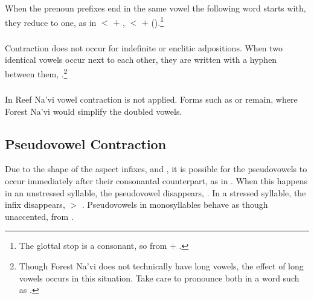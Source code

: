 \subsubsection{} When the prenoun prefixes end in the same vowel the
following word starts with, they reduce to one, as in  $<$
 $+$ ,  $<$  $+$ 
().\footnote{The glottal stop is a
consonant, so  from  $+$ .}
\label{l-and-s:phonotactics:precontract}

\subsubsection{} Contraction does not occur for indefinite  or
enclitic adpositions.  When two identical vowels occur next to each
other, they are written with a hyphen between them, 
  .\footnote{Though Forest
Na'vi does not technically have long vowels, the effect of long vowels
occurs in this situation.  Take care to pronounce both  in a word
such as .}

\subsubsection{} In Reef Na'vi vowel contraction is not applied.
Forms such as  or  remain, where Forest Na'vi
would simplify the doubled vowels.
\label{rn:no-contract}

\subsection{Pseudovowel Contraction} Due to the shape of the aspect
infixes,  and , it is possible for the
pseudovowels to occur immediately after their consonantal counterpart,
as in .  When this happens in an unstressed
syllable, the pseudovowel disappears, .  In a
stressed syllable, the infix disappears,  $>$
.  Pseudovowels in monosyllables behave as though
unaccented,  from . 


